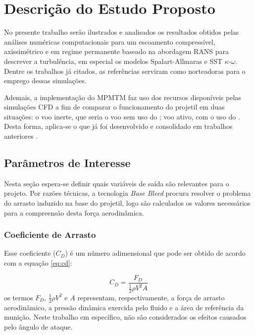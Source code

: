 \chapter{Descrição do Estudo Proposto}\label{cap:estudo-proposto}
\graphicspath{{chapter-06/img-cap06/}}

No presente trabalho serão ilustrados e analisados os resultados obtidos pelas análises numéricas computacionais para um escoamento compressível, axissimétrico e em regime permanente baseado na abordagem RANS para descrever a turbulência, em especial os modelos Spalart-Allmaras e SST $\kappa$-$\omega$. Dentre os trabalhos já citados, as referências \cite{Sahu1985,Mahmoud2009,torangatti2basawaraj,belaidouni2016,nicolas-perez_accuracy_2017,Dali2018a,Lucena2020,Reddy2021} serviram como norteadoras para o emprego dessas simulações. 

Ademais, a implementação do MPMTM faz uso dos recursos disponíveis pelas simulações CFD a fim de comparar o funcionamento do projetil em duas situações: o voo inerte, que seria o voo sem uso do ; voo ativo, com o uso do . Desta forma, aplica-se o que já foi desenvolvido e consolidado em trabalhos anteriores \cite{Gauchoux1991,balon2006analysis,Abou-Elela2013,Skande2014,Lim2016,Rosendo2020}.

\section{Parâmetros de Interesse}

Nesta seção espera-se definir quais variáveis de saída são relevantes para o projeto. Por razões técnicas, a tecnologia \textit{Base Bleed} procura resolver o problema do arrasto induzido na base do projetil, logo são calculados os valores necessários para a compreensão desta força aerodinâmica. 

\subsection{Coeficiente de Arrasto}

Esse coeficiente ($C_D$) é um número adimensional que pode ser obtido de acordo com a equação \ref{eq:cd}:

\begin{equation} \label{eq:cd}
    C_{D} = \frac{F_{D}}{\frac{1}{2}\rho V^2 A}
\end{equation}
%
os termos $F_{D}$, $\frac{1}{2}\rho V^2$ e $A$ representam, respectivamente, a força de arrasto aerodinâmico, a pressão dinâmica exercida pelo fluido e a área de referência da munição. Neste trabalho em específico, não são considerados os efeitos causados pelo ângulo de ataque.

